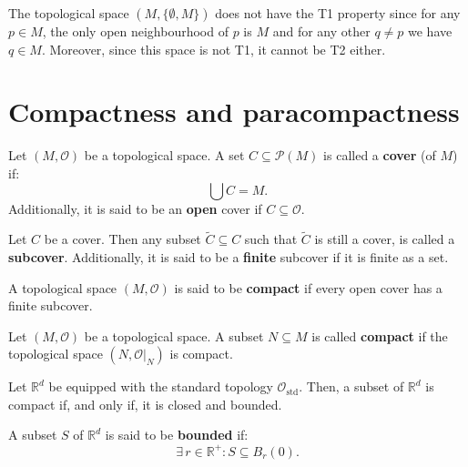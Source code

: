 \documentclass[root.tex]{subfiles}
\begin{document}
\begin{myex}
The topological space $(M,\{\emptyset,M\})$ does not have the T1 property since for any $p \in M$, the only open neighbourhood of $p$ is $M$ and for any other $q\neq p$ we have $q\in M$. Moreover, since this space is not T1, it cannot be T2 either.
\end{myex}

\section{Compactness and paracompactness}

\begin{mydef}
  Let $(M,\mathcal{O})$ be a topological space. A set $C \subseteq \mathcal{P}(M)$ is called a \textbf{cover} (of $M$) if:
$$
\bigcup C = M.
$$
Additionally, it is said to be an \textbf{open} cover if $C \subseteq \mathcal{O}$.
\end{mydef}

\begin{mydef}
Let $C$ be a cover. Then any subset $\widetilde{C}\subseteq C$ such that $\widetilde{C}$ is still a cover, is called a \textbf{subcover}. Additionally, it is said to be a \textbf{finite} subcover if it is finite as a set.
\end{mydef}

\begin{mydef}
A topological space $(M,\mathcal{O})$ is said to be \textbf{compact} if every open cover has a finite subcover.
\end{mydef}

\begin{mydef}
Let $(M,\mathcal{O})$ be a topological space. A subset $N\subseteq M$ is called \textbf{compact} if the topological space $(N,\mathcal{O}|_N)$ is compact.
\end{mydef}

\begin{theorem}
Let $\mathbb{R}^d$ be equipped with the standard topology $\mathcal{O}_\mathrm{std}$. Then, a subset of $\mathbb{R}^d$ is compact if, and only if, it is closed and bounded.
\end{theorem}

A subset $S$ of $\mathbb{R}^d$ is said to be \textbf{bounded} if:
$$
\exists \, r \in \mathbb{R}^+ : S \subseteq B_r(0). 
$$
\end{document}
